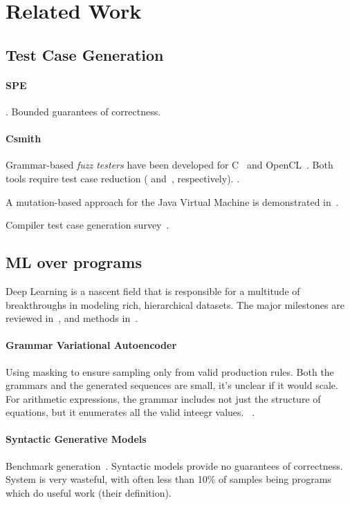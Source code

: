 \section{Related Work}\label{sec:rw}

\subsection{Test Case Generation}


\paragraph{SPE} . Bounded guarantees of correctness.


\paragraph{Csmith}  Grammar-based \emph{fuzz testers} have been developed for C~\cite{Yang2011} and OpenCL~\cite{Lidbury2015a}. Both tools require test case reduction (\cite{Regehr2012a} and~\cite{Pflanzer2016}, respectively). .

A mutation-based approach for the Java Virtual Machine is demonstrated in~\cite{Chena}.

Compiler test case generation survey~\cite{Boujarwah1997}.

\subsection{ML over programs} 

Deep Learning is a nascent field that is responsible for a multitude of breakthroughs in modeling rich, hierarchical datasets. The major milestones are reviewed in~\cite{Wang2017}, and methods in~\cite{Schmidhuber2014}.

\paragraph{Grammar Variational Autoencoder} Using masking to ensure sampling only from valid production rules. Both the grammars and the generated sequences are small, it's unclear if it would scale. For arithmetic expressions, the grammar includes not just the structure of equations, but it enumerates all the valid inteegr values. ~\cite{Kusner2017}.

\paragraph{Syntactic Generative Models} Benchmark generation~\cite{Cummins2017a}. Syntactic models provide no guarantees of correctness. System is very wasteful, with often less than 10\% of samples being programs which do useful work (their definition).

